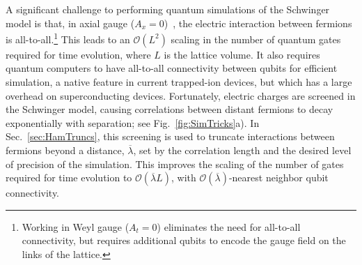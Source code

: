 \documentclass[aps, prc, tightenlines,superscriptaddress, letterpaper, amsmath, amssymb, preprintnumbers, floatfix, longbibliography, nofootinbib]{revtex4-2}
\begin{document}
A significant challenge to performing quantum simulations of the Schwinger model is that, in axial gauge ($A_x=0$)~\cite{Farrell:2022wyt}, the electric interaction between fermions is all-to-all.\footnote{Working in Weyl gauge ($A_t=0$) eliminates the need for all-to-all connectivity, but requires additional qubits to encode the gauge field on the links of the lattice.}
This leads to an $\mathcal{O}(L^2)$ scaling in the number of quantum gates required for time evolution, where $L$ is the lattice volume.
It also requires quantum computers to have all-to-all connectivity between qubits for efficient simulation, a native feature in current
trapped-ion devices, but which has a large overhead on superconducting devices.
Fortunately, electric charges are screened in the Schwinger model, causing correlations between distant fermions to decay exponentially with separation; see Fig.~\ref{fig:SimTricks}a).
In Sec.~\ref{sec:HamTruncs}, this screening is used to truncate interactions between fermions beyond a distance, $\overline{\lambda}$, set by the correlation length and the desired level of precision of the simulation.
This improves the scaling of the number of gates required for time evolution to $\mathcal{O}(\overline{\lambda} L)$, with $\mathcal{O}(\overline{\lambda})$-nearest neighbor qubit connectivity.
\end{document}
